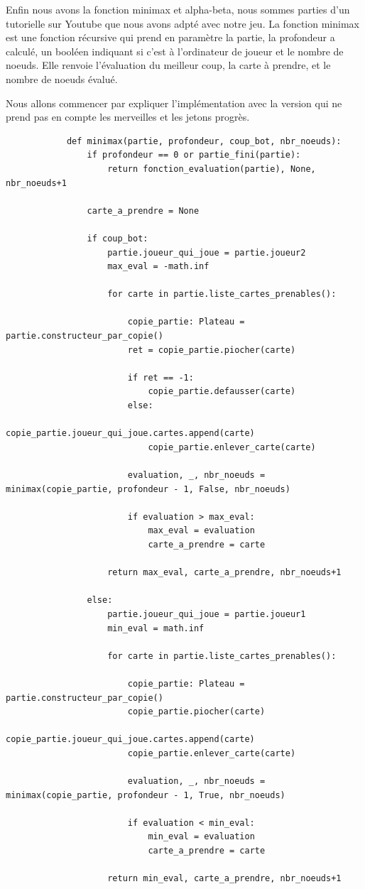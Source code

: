 \documentclass[a4paper, 12pt, french]{article}
\begin{document}
		Enfin nous avons la fonction minimax et alpha-beta, nous sommes parties d'un tutorielle
		sur Youtube \cite{implementation_minimax_alpha_beta} que nous avons adpté avec notre jeu.
		La fonction minimax est une fonction récursive qui prend en paramètre la partie, 
		la profondeur a calculé, un booléen indiquant si c'est à l'ordinateur de joueur et le nombre
		de noeuds. Elle renvoie l'évaluation du meilleur coup, la carte à prendre, 
		et le nombre de noeuds évalué.

		Nous allons commencer par expliquer l'implémentation avec la version 
		qui ne prend pas en compte les merveilles et les jetons progrès.
		\begin{lstlisting}
			def minimax(partie, profondeur, coup_bot, nbr_noeuds):
				if profondeur == 0 or partie_fini(partie):
					return fonction_evaluation(partie), None, nbr_noeuds+1
				
				carte_a_prendre = None
				
				if coup_bot:
					partie.joueur_qui_joue = partie.joueur2
					max_eval = -math.inf
					
					for carte in partie.liste_cartes_prenables():
						
						copie_partie: Plateau = partie.constructeur_par_copie()
						ret = copie_partie.piocher(carte)
						
						if ret == -1:
							copie_partie.defausser(carte)
						else:
							copie_partie.joueur_qui_joue.cartes.append(carte)
							copie_partie.enlever_carte(carte)
						
						evaluation, _, nbr_noeuds = minimax(copie_partie, profondeur - 1, False, nbr_noeuds)
						
						if evaluation > max_eval:
							max_eval = evaluation
							carte_a_prendre = carte
							
					return max_eval, carte_a_prendre, nbr_noeuds+1
				
				else:
					partie.joueur_qui_joue = partie.joueur1
					min_eval = math.inf
					
					for carte in partie.liste_cartes_prenables():
						
						copie_partie: Plateau = partie.constructeur_par_copie()
						copie_partie.piocher(carte)
						copie_partie.joueur_qui_joue.cartes.append(carte)
						copie_partie.enlever_carte(carte)
					
						evaluation, _, nbr_noeuds = minimax(copie_partie, profondeur - 1, True, nbr_noeuds)
						
						if evaluation < min_eval:
							min_eval = evaluation
							carte_a_prendre = carte
					
					return min_eval, carte_a_prendre, nbr_noeuds+1
		\end{lstlisting}
\end{document}
